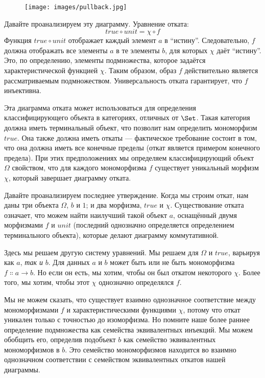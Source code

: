 \begin{figure}[H]
  \centering
  \texttt{[image: images/pullback.jpg]}
\end{figure}

\noindent
Давайте проанализируем эту диаграмму. Уравнение отката:
\[\mathit{true} \circ \mathit{unit} = \chi \circ f\]
Функция $\mathit{true} \circ \mathit{unit}$ отображает каждый элемент $a$ в
``истину''. Следовательно, $f$ должна отображать все элементы $a$ в
те элементы $b$, для которых $\chi$ даёт ``истину''. Это,
по определению, элементы подмножества, которое задаётся
характеристической функцией $\chi$. Таким образом, образ $f$ действительно является
рассматриваемым подмножеством. Универсальность отката гарантирует, что
$f$ инъективна.

Эта диаграмма отката может использоваться для определения классифицирующего объекта в
категориях, отличных от $\Set$. Такая категория должна иметь терминальный
объект, что позволит нам определить мономорфизм $\mathit{true}$. Она также должна
иметь откаты --- фактическое требование состоит в том, что она должна иметь все
конечные пределы (откат является примером конечного предела). При этих
предположениях мы определяем классифицирующий объект $\Omega$ свойством,
что для каждого мономорфизма $f$ существует уникальный морфизм
$\chi$, который завершает диаграмму отката.

Давайте проанализируем последнее утверждение. Когда мы строим откат, нам
даны три объекта $\Omega$, $b$ и $1$; и два
морфизма, $\mathit{true}$ и $\chi$. Существование отката
означает, что можем найти наилучший такой объект $a$, оснащённый
двумя морфизмами $f$ и $\mathit{unit}$ (последний однозначно
определяется определением терминального объекта), которые делают
диаграмму коммутативной.

Здесь мы решаем другую систему уравнений. Мы решаем для
$\Omega$ и $\mathit{true}$, варьируя как $a$, \emph{так и}
$b$. Для данных $a$ и $b$ может быть или не
быть мономорфизма $f \Colon a \to b$. Но если он есть, мы
хотим, чтобы он был откатом некоторого $\chi$. Более того, мы хотим, чтобы этот
$\chi$ однозначно определялся $f$.

Мы не можем сказать, что существует взаимно однозначное соответствие между
мономорфизмами $f$ и характеристическими функциями $\chi$,
потому что откат уникален только с точностью до изоморфизма. Но помните наше
более раннее определение подмножества как семейства эквивалентных инъекций. Мы
можем обобщить его, определив подобъект $b$ как семейство
эквивалентных мономорфизмов в $b$. Это семейство мономорфизмов находится
во взаимно однозначном соответствии с семейством эквивалентных откатов
нашей диаграммы.


